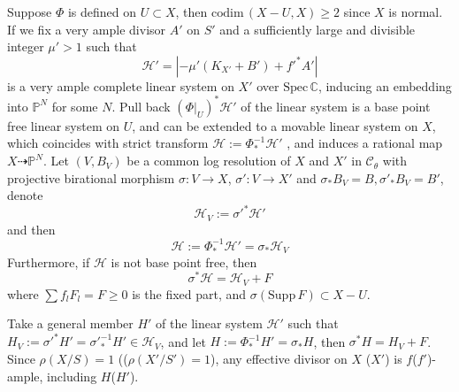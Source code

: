 \documentclass{article}
\begin{document}
Suppose $ \Phi $ is defined on $ U\subset X $, then $ \mathrm{codim}\,(X-U,X)\geqslant 2 $ since $ X $ is normal. If we fix a very ample divisor $ A'  $ on $ S' $ and a sufficiently large and divisible integer $ \mu'>1 $ such that
$$ \mathcal{H}'=|-\mu' (K_{X'}+B') +f'^*A'| $$
is a very ample complete linear system on $ X' $ over $ \mathrm{Spec}\,\mathbb{C} $,  inducing an embedding into $ \mathbb{P}^N $ for some $ N $. Pull back $ (\Phi|_U)^*\mathcal{H}' $ of the linear system is a base point free linear system on $ U $, and can be extended  to a movable linear system on $ X $, which coincides with strict transform $ \mathcal{H}:=\Phi^{-1}_*\mathcal{H}' $ , and induces a rational map $ X\dashrightarrow \mathbb{P}^N $. Let $ (V,B_V) $ be a common log resolution of $ X $ and $ X' $ in $ \mathcal{C}_\theta $ with projective birational morphism $ \sigma:V\to X$,   $\sigma':V\to X' $ and $\sigma_*B_V=B, \sigma'_*B_V=B' $, denote
$$ \mathcal{H}_V:=\sigma'^*\mathcal{H}' $$
and then
$$ \mathcal{H}:=\Phi^{-1}_*\mathcal{H}'=\sigma_*\mathcal{H}_V $$
Furthermore, if $ \mathcal{H} $ is not base point free, then
$$ \sigma^*\mathcal{H}=\mathcal{H}_V+F $$
where $ \sum f_lF_l=F\geqslant0 $ is the fixed part, and $ \sigma(\mathrm{Supp}\,F)\subset X-U $.

Take a general member $ H' $ of the linear system $ \mathcal{H}' $ such that $ H_V:=\sigma'^*H'=\sigma'^{-1}_*H'\in \mathcal{H}_V $, and let $ H:=\Phi^{-1}_*H'=\sigma_*H $, then $ \sigma^*H=H_V+F $. Since $ \rho(X/S)=1 $ (($\rho( X'/S')=1 $), any effective divisor on $ X $ ($ X' $) is $ f $($ f' $)-ample, including $ H $($ H' $).
\end{document}
